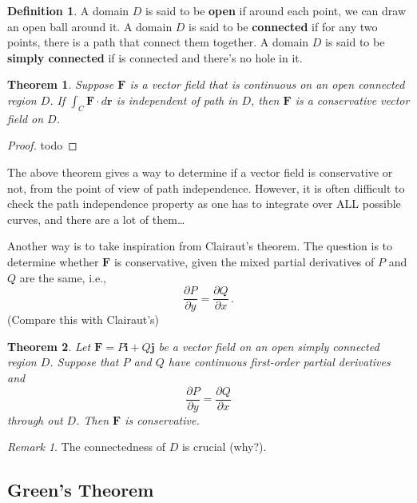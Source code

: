 \documentclass[
]{article}
\newtheorem{theorem}{Theorem}[section]
\theoremstyle{definition}
\newtheorem{definition}{Definition}[section]
\theoremstyle{definition}
\theoremstyle{definition}
\theoremstyle{definition}
\theoremstyle{remark}
\newtheorem*{remark}{Remark}
\begin{document}
\begin{definition}
A domain \(D\) is said to be \textbf{open} if around each point, we can draw an open ball around it.
A domain \(D\) is said to be \textbf{connected} if for any two points, there is a path that connect them
together.
A domain \(D\) is said to be \textbf{simply connected} if is connected and there's no hole in it.
\end{definition}

\begin{theorem}
Suppose \(\mathbf{F}\) is a vector field that is continuous on an open
connected region \(D\).
If \(\int_C \mathbf{F} \cdot d \mathbf{r}\) is independent of path in \(D\),
then \(\mathbf{F}\) is a conservative vector field on \(D\).
\end{theorem}

\begin{proof}
todo
\end{proof}

The above theorem gives a way to determine if a vector field is conservative or not, from
the point of view of path independence.
However, it is often difficult to check the path independence property as one has to
integrate over ALL possible curves, and there are a lot of them\ldots{}

Another way is to take inspiration from Clairaut's theorem.
The question is to determine whether \(\mathbf{F}\) is conservative, given the mixed partial
derivatives of \(P\) and \(Q\) are the same, i.e.,
\begin{equation*}
    \frac{\partial P}{\partial y} = \frac{\partial Q}{\partial x}\,.
\end{equation*}
(Compare this with Clairaut's)

\begin{theorem}
Let \(\mathbf{F} = P\mathbf{i} + Q\mathbf{j}\) be a vector field on an open simply connected
region \(D\). Suppose that
\(P\) and \(Q\) have continuous first-order partial derivatives and
\begin{equation*}
    \frac{\partial P}{\partial y} = \frac{\partial Q}{\partial x}
\end{equation*}
through out \(D\).
Then \(\mathbf{F}\) is conservative.
\end{theorem}

\begin{remark}
The connectedness of \(D\) is crucial (why?).
\end{remark}

\subsection{Green's Theorem}\label{greens-theorem}
\end{document}
